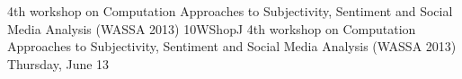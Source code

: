 \begin{wsschedule}
{4th workshop on Computation Approaches to Subjectivity, Sentiment and Social Media Analysis (WASSA 2013)}
{10}{WShopJ}
{4th workshop on Computation Approaches to Subjectivity, Sentiment and Social Media Analysis (WASSA 2013)}
{Thursday, June 13}{\WShopLocJ}

\end{wsschedule}
